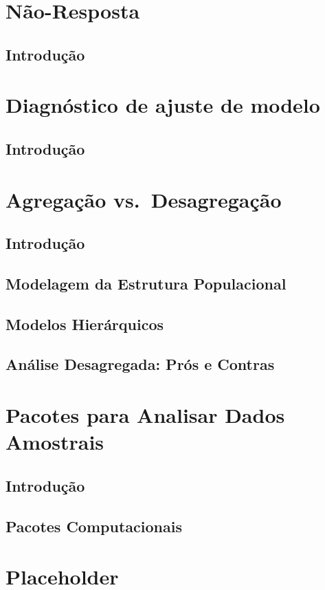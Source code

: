 \documentclass[]{book}
\theoremstyle{definition}
\theoremstyle{definition}
\theoremstyle{definition}
\theoremstyle{remark}
\begin{document}
\chapter{Não-Resposta}\label{nao-resposta}

\section{Introdução}\label{introducao-5}

\chapter{Diagnóstico de ajuste de
modelo}\label{diagnostico-de-ajuste-de-modelo}

\section{Introdução}\label{introducao-6}

\chapter{Agregação vs.~Desagregação}\label{agregdesag}

\section{Introdução}\label{introducao-7}

\section{Modelagem da Estrutura
Populacional}\label{modelagem-da-estrutura-populacional}

\section{Modelos Hierárquicos}\label{modelos-hierarquicos-1}

\section{Análise Desagregada: Prós e
Contras}\label{analise-desagregada-pros-e-contras}

\chapter{Pacotes para Analisar Dados Amostrais}\label{pacotes}

\section{Introdução}\label{introducao-8}

\section{Pacotes Computacionais}\label{pacotes-computacionais}

\chapter{Placeholder}\label{placeholder}


\end{document}
